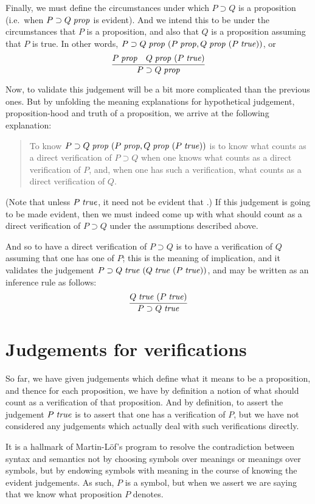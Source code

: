 \documentclass[main.tex]{subfiles}
\begin{document}
Finally, we must define the circumstances under which $P\supset Q$ is
a proposition (i.e.\ when $P\supset Q\;\mathit{prop}$ is evident). And we
intend this to be under the circumstances that $P$ is a proposition,
and also that $Q$ is a proposition assuming that $P$ is true. In other
words, $P\supset Q\;\mathit{prop}\ (P\;\mathit{prop},
Q\;\mathit{prop}\ (P\;\mathit{true}))$, or
\[
  \infer{
    \isprop{P\supset Q}
  }{
    \isprop{P} &
    \hyp{\isprop{Q}}{\istrue{P}}
  }
\]

Now, to validate this judgement will be a bit more complicated than the
previous ones. But by unfolding the meaning explanations for hypothetical
judgement, proposition-hood and truth of a proposition, we arrive at the
following explanation:
\begin{quote}
  To know $P\supset Q\;\mathit{prop}\ (P\;\mathit{prop},Q\;\mathit{prop}\ (P\;\mathit{true}))$ is
  to know what counts as a direct verification of $P\supset Q$ when one knows what
  counts as a direct verification of $P$, and, when one has such a verification, what
  counts as a direct verification of $Q$.
\end{quote}

(Note that unless $P\;\mathit{true}$, it need not be evident that .) If
this judgement is going to be made evident, then we must indeed come up with
what should count as a direct verification of $P\supset Q$ under the
assumptions described above.

And so to have a direct verification of $P\supset Q$ is to have a
verification of $Q$ assuming that one has one of $P$; this is the
meaning of implication, and it validates the judgement
$P\supset Q\;\mathit{true}\ (Q\;\mathit{true}\ (P\;\mathit{true}))$, and may be
written as an inference rule as follows:
\[
  \infer{
    \istrue{P\supset Q}
  }{
    \hyp{\istrue{Q}}{\istrue{P}}
  }
\]

\section{Judgements for verifications}

So far, we have given judgements which define what it means to be a
proposition, and thence for each proposition, we have by definition a notion of
what should count as a verification of that proposition. And by definition, to
assert the judgement $P\;\mathit{true}$ is to assert that one has a verification of
$P$, but we have not considered any judgements which actually deal with such
verifications directly.

It is a hallmark of Martin-L\"of's program to resolve the contradiction between
syntax and semantics not by choosing symbols over meanings or meanings over
symbols, but by endowing symbols with meaning in the course of knowing the
evident judgements. As such, $P$ is a symbol, but when we assert  we
are saying that we know what proposition $P$ denotes.
\end{document}
